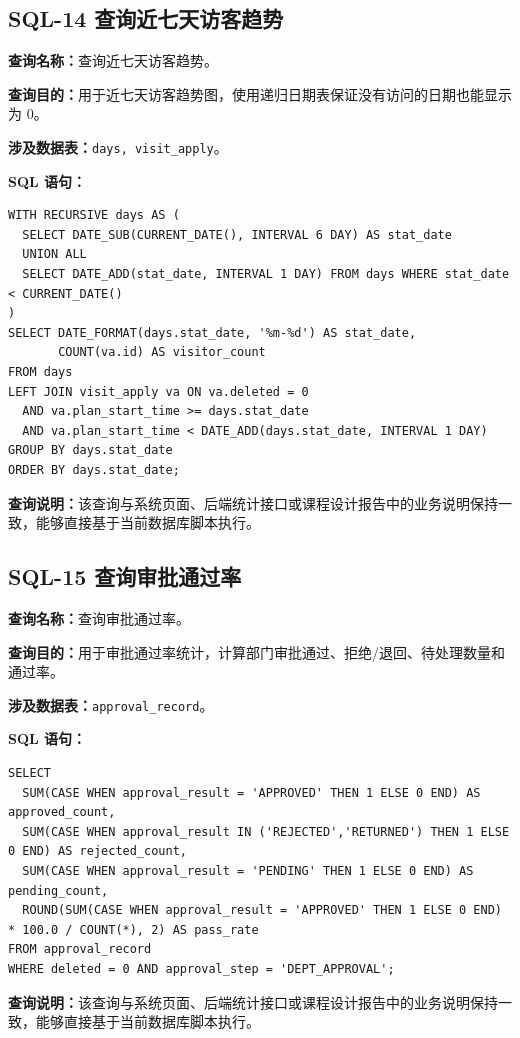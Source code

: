 \subsection{SQL-14 查询近七天访客趋势}
\textbf{查询名称：}查询近七天访客趋势。\par
\textbf{查询目的：}用于近七天访客趋势图，使用递归日期表保证没有访问的日期也能显示为 0。\par
\textbf{涉及数据表：}\texttt{days, visit\_apply}。\par
\textbf{SQL 语句：}
\begin{lstlisting}[style=sqlstyle]
WITH RECURSIVE days AS (
  SELECT DATE_SUB(CURRENT_DATE(), INTERVAL 6 DAY) AS stat_date
  UNION ALL
  SELECT DATE_ADD(stat_date, INTERVAL 1 DAY) FROM days WHERE stat_date < CURRENT_DATE()
)
SELECT DATE_FORMAT(days.stat_date, '%m-%d') AS stat_date,
       COUNT(va.id) AS visitor_count
FROM days
LEFT JOIN visit_apply va ON va.deleted = 0
  AND va.plan_start_time >= days.stat_date
  AND va.plan_start_time < DATE_ADD(days.stat_date, INTERVAL 1 DAY)
GROUP BY days.stat_date
ORDER BY days.stat_date;
\end{lstlisting}
\textbf{查询说明：}该查询与系统页面、后端统计接口或课程设计报告中的业务说明保持一致，能够直接基于当前数据库脚本执行。

\subsection{SQL-15 查询审批通过率}
\textbf{查询名称：}查询审批通过率。\par
\textbf{查询目的：}用于审批通过率统计，计算部门审批通过、拒绝/退回、待处理数量和通过率。\par
\textbf{涉及数据表：}\texttt{approval\_record}。\par
\textbf{SQL 语句：}
\begin{lstlisting}[style=sqlstyle]
SELECT
  SUM(CASE WHEN approval_result = 'APPROVED' THEN 1 ELSE 0 END) AS approved_count,
  SUM(CASE WHEN approval_result IN ('REJECTED','RETURNED') THEN 1 ELSE 0 END) AS rejected_count,
  SUM(CASE WHEN approval_result = 'PENDING' THEN 1 ELSE 0 END) AS pending_count,
  ROUND(SUM(CASE WHEN approval_result = 'APPROVED' THEN 1 ELSE 0 END) * 100.0 / COUNT(*), 2) AS pass_rate
FROM approval_record
WHERE deleted = 0 AND approval_step = 'DEPT_APPROVAL';
\end{lstlisting}
\textbf{查询说明：}该查询与系统页面、后端统计接口或课程设计报告中的业务说明保持一致，能够直接基于当前数据库脚本执行。

